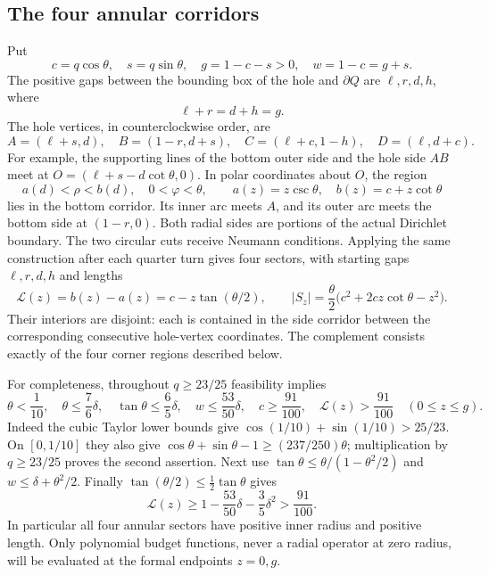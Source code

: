 \documentclass[11pt,reqno]{amsart}
\numberwithin{equation}{section}
\begin{document}
\subsection{The four annular corridors}
\label{geo:corridors}

Put
\[
 c=q\cos\theta,\quad s=q\sin\theta,\quad
 g=1-c-s>0,\quad w=1-c=g+s.
\]
The positive gaps between the bounding box of the hole and $\partial Q$
are $\ell,r,d,h$, where
\[
 \ell+r=d+h=g.
\]
The hole vertices, in counterclockwise order, are
\[
 A=(\ell+s,d),\quad B=(1-r,d+s),\quad
 C=(\ell+c,1-h),\quad D=(\ell,d+c).
\]
For example, the supporting lines of the bottom outer side and the
hole side $AB$ meet at
$O=(\ell+s-d\cot\theta,0)$.  In polar coordinates about $O$, the
region
\[
 a(d)<\rho<b(d),\quad0<\varphi<\theta,
 \qquad a(z)=z\csc\theta,\quad b(z)=c+z\cot\theta
\]
lies in the bottom corridor.  Its inner arc meets $A$, and its outer
arc meets the bottom side at $(1-r,0)$.  Both radial sides are portions
of the actual Dirichlet boundary.  The two circular cuts receive
Neumann conditions.  Applying the same construction after each quarter
turn gives four sectors, with starting gaps $\ell,r,d,h$ and lengths
\begin{equation}\label{geo:sector-geometry}
 \mathcal L(z)=b(z)-a(z)=c-z\tan(\theta/2),
 \qquad
 |S_z|=\frac\theta2
       \bigl(c^2+2cz\cot\theta-z^2\bigr).
\end{equation}
Their interiors are disjoint: each is contained in the side corridor
between the corresponding consecutive hole-vertex coordinates.  The
complement consists exactly of the four corner regions described below.

For completeness, throughout $q\ge23/25$ feasibility implies
\begin{equation}\label{geo:coarse-geometry}
 \theta<\frac1{10},\quad
 \theta\le\frac76\delta,\quad
 \tan\theta\le\frac65\delta,\quad
 w\le\frac{53}{50}\delta,\quad
 c\ge\frac{91}{100},\quad
 \mathcal L(z)>\frac{91}{100}\quad(0\le z\le g).
\end{equation}
Indeed the cubic Taylor lower bounds give
$\cos(1/10)+\sin(1/10)>25/23$.  On $[0,1/10]$ they also give
$\cos\theta+\sin\theta-1\ge(237/250)\theta$; multiplication by
$q\ge23/25$ proves the second assertion.  Next use
$\tan\theta\le\theta/(1-\theta^2/2)$ and
$w\le\delta+\theta^2/2$.  Finally
$\tan(\theta/2)\le\tfrac12\tan\theta$ gives
\[
 \mathcal L(z)\ge1-\frac{53}{50}\delta-\frac35\delta^2
                         >\frac{91}{100}.
\]
In particular all four annular sectors have positive inner radius and
positive length.  Only polynomial budget functions, never a radial
operator at zero radius, will be evaluated at the formal endpoints
$z=0,g$.
\end{document}
